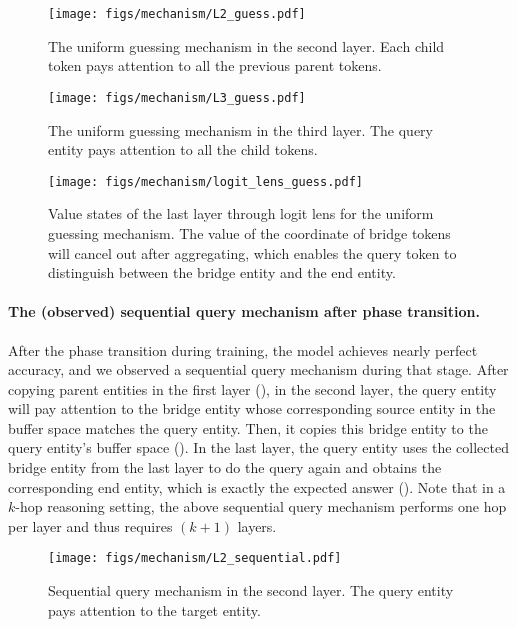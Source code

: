 \begin{figure}[h]
    \centering
    \texttt{[image: figs/mechanism/L2\_guess.pdf]}
    \caption{The uniform guessing mechanism in the second layer. Each child token pays attention to all the previous parent tokens.}
    \label{fig:mech:L2_guess}
\end{figure}

\begin{figure}[h]
    \centering
    \texttt{[image: figs/mechanism/L3\_guess.pdf]}
    \caption{The uniform guessing mechanism in the third layer. The query entity pays attention to all the child tokens.}
    \label{fig:mech:L3_guess}
\end{figure}

\begin{figure}[h]
    \centering
    \texttt{[image: figs/mechanism/logit\_lens\_guess.pdf]}
    \caption{Value states of the last layer through logit lens for the uniform guessing mechanism. The value of the coordinate of bridge tokens will cancel out after aggregating, which enables the query token to distinguish between the bridge entity and the end entity.}
    \label{fig:mech:logit_lens_guess}
\end{figure}

\paragraph{The (observed) sequential query mechanism after phase transition.} After the phase transition during training, the model achieves nearly perfect accuracy, and we observed a sequential query mechanism during that stage. After copying parent entities in the first layer (), in the second layer, the query entity will pay attention to the bridge entity whose corresponding source entity in the buffer space matches the query entity. Then, it copies this bridge entity to the query entity's buffer space (). In the last layer, the query entity uses the collected bridge entity from the last layer to do the query again and obtains the corresponding end entity, which is exactly the expected answer (). Note that in a $k$-hop reasoning setting, the above sequential query mechanism performs one hop per layer and thus requires $(k+1)$ layers.

\begin{figure}[h]
    \centering
    \texttt{[image: figs/mechanism/L2\_sequential.pdf]}
    \caption{Sequential query mechanism in the second layer. The query entity pays attention to the target \brga  entity.}
    \label{fig:mech:L2_sequential}
\end{figure}


